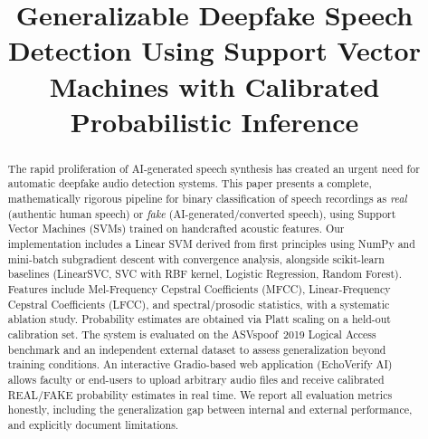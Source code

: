 \documentclass[conference]{IEEEtran}
\begin{document}
\title{Generalizable Deepfake Speech Detection Using Support Vector Machines
with Calibrated Probabilistic Inference}

\author{
  \and
  \and
}

\maketitle

\begin{abstract}
The rapid proliferation of AI-generated speech synthesis has created an urgent need
for automatic deepfake audio detection systems. This paper presents a complete,
mathematically rigorous pipeline for binary classification of speech recordings as
\emph{real} (authentic human speech) or \emph{fake} (AI-generated/converted speech),
using Support Vector Machines (SVMs) trained on handcrafted acoustic features.
Our implementation includes a Linear SVM derived from first principles using NumPy
and mini-batch subgradient descent with convergence analysis, alongside scikit-learn
baselines (LinearSVC, SVC with RBF kernel, Logistic Regression, Random Forest).
Features include Mel-Frequency Cepstral Coefficients (MFCC), Linear-Frequency Cepstral
Coefficients (LFCC), and spectral/prosodic statistics, with a systematic ablation study.
Probability estimates are obtained via Platt scaling on a held-out calibration set.
The system is evaluated on the ASVspoof~2019 Logical Access benchmark and an
independent external dataset to assess generalization beyond training conditions.
An interactive Gradio-based web application (EchoVerify AI) allows faculty or end-users
to upload arbitrary audio files and receive calibrated REAL/FAKE probability estimates
in real time. We report all evaluation metrics honestly, including the generalization
gap between internal and external performance, and explicitly document limitations.
\end{abstract}
\end{document}
